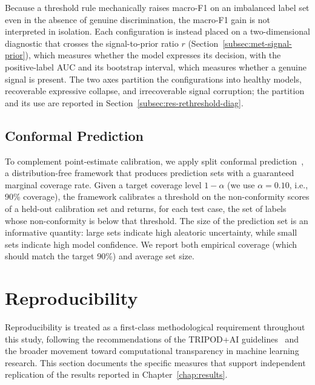 Because a threshold rule mechanically raises macro-F1 on an imbalanced 
label set even in the absence of genuine discrimination, the macro-F1 
gain is not interpreted in isolation. Each configuration is instead 
placed on a two-dimensional diagnostic that crosses the signal-to-prior 
ratio $r$ (Section~\ref{subsec:met-signal-prior}), which measures 
whether the model expresses its decision, with the positive-label AUC 
and its bootstrap interval, which measures whether a genuine signal is 
present. The two axes partition the configurations into healthy models, 
recoverable expressive collapse, and irrecoverable signal corruption; 
the partition and its use are reported in 
Section~\ref{subsec:res-rethreshold-diag}.

\subsection{Conformal Prediction}
\label{subsec:met-conformal}

To complement point-estimate calibration, we apply split conformal 
prediction~\cite{vovk2005}, a distribution-free framework that produces 
prediction sets with a guaranteed marginal coverage rate. Given a 
target coverage level $1 - \alpha$ (we use $\alpha = 0.10$, i.e., 90\% 
coverage), the framework calibrates a threshold on the non-conformity 
scores of a held-out calibration set and returns, for each test case, 
the set of labels whose non-conformity is below that threshold. The 
size of the prediction set is an informative quantity: large sets 
indicate high aleatoric uncertainty, while small sets indicate high 
model confidence. We report both empirical coverage (which should match 
the target 90\%) and average set size.

\section{Reproducibility}
\label{sec:met-reproducibility}

Reproducibility is treated as a first-class methodological requirement 
throughout this study, following the recommendations of the TRIPOD+AI 
guidelines~\cite{collins2024tripod} and the broader movement toward 
computational transparency in machine learning research. This section 
documents the specific measures that support independent replication of 
the results reported in Chapter~\ref{chap:results}.

